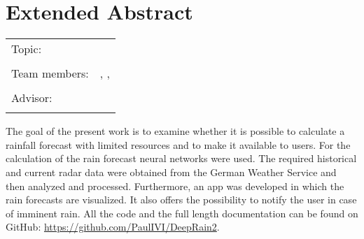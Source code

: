 \chapter*{Extended Abstract}

\begin{center}
	\begingroup
	\renewcommand*{\arraystretch}{1}
	{\makeatletter	
		\begin{tabular}{p{3.2cm}p{9.6cm}}
			Topic: & \thema \\
			& \\
			Team members: & \verfasserA, \verfasserB, \verfasserC \\
			& \\
			Advisor: & \hoschschule \newline \institut \newline \prueferA \\
			& \\
		\end{tabular}
		
		\makeatother}
	\endgroup
\end{center}

\bigskip

\noindent

The goal of the present work is to examine whether it is possible to calculate a rainfall forecast with limited resources and to make it available to users. 
For the calculation of the rain forecast neural networks were used. 
The required historical and current radar data were obtained from the German Weather Service and then analyzed and processed. 
Furthermore, an app was developed in which the rain forecasts are visualized.  
It also offers the possibility to notify the user in case of imminent rain. 
All the code and the full length documentation can be found on GitHub: \url{https://github.com/PaulIVI/DeepRain2}.



